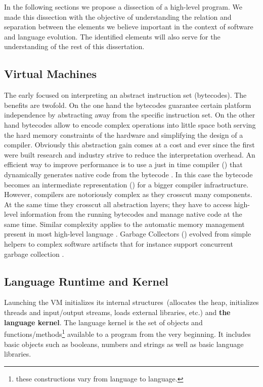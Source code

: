 In the following sections we propose a dissection of a high-level program. We made this dissection with the objective of understanding the relation and separation between the elements we believe important in the context of software and language evolution. The identified elements will also serve for the understanding of the rest of this dissertation.



\subsection{Virtual Machines}

The early \VMs focused on interpreting an abstract instruction set (bytecodes).
The benefits are twofold.
On the one hand the bytecodes guarantee certain platform independence by abstracting away from the \CPU specific instruction set.
On the other hand bytecodes allow to encode complex operations into little space both serving the hard memory constraints of the hardware and simplifying the design of a compiler.
Obviously this abstraction gain comes at a cost and ever since the first \VMs were built research and industry strive to reduce the interpretation overhead.
An efficient way to improve performance is to use a just in time compiler (\JIT) that dynamically generates native code from the bytecode \cite{Deut84a}.
In this case the bytecode becomes an intermediate representation (\IR) for a bigger compiler infrastructure.
However, \JIT compilers are notoriously complex as they crosscut many \VM components.
At the same time they crosscut all abstraction layers; they have to access high-level information from the running bytecodes and manage native code at the same time.
Similar complexity applies to the automatic memory management present in most high-level language \VMs.
Garbage Collectors (\GC) evolved from simple helpers to complex software artifacts that for instance support concurrent garbage collection \cite{Clic05a}.

\subsection{Language Runtime and Kernel}

Launching the VM initializes its internal structures~(\ie allocates the heap, initializes threads and input/output streams, loads external libraries, etc.) and \textbf{the language kernel}. The language kernel is the set of objects and functions/methods\footnote{these constructions vary from language to language.} available to a program from the very beginning. It includes basic objects such as booleans, numbers and strings as well as basic language libraries.

